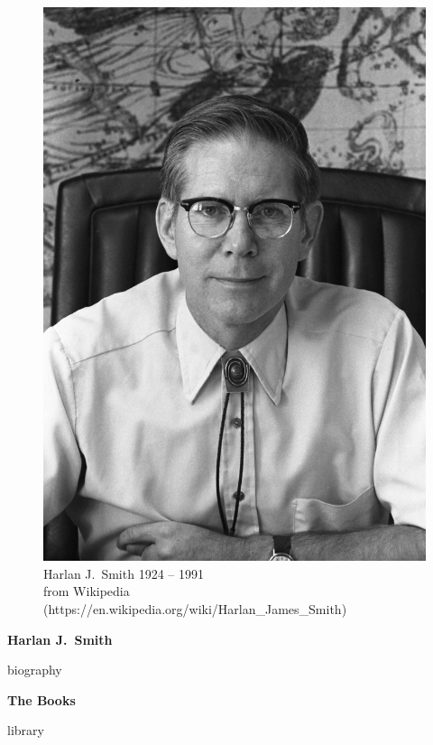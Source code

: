 \documentclass[letterpaper]{book}
\begin{document}
\thispagestyle{empty}
\begin{figure}[t]
  \centering
  \includegraphics{hjs_photo.jpg}
  Harlan J.~Smith 1924 -- 1991 \\
  {\scriptsize from Wikipedia
  (https://en.wikipedia.org/wiki/Harlan\_James\_Smith)}
  \label{fig:hjs}
\end{figure}
\clearpage

\pagestyle{plain}
\vspace*{1 in}
\centerline{\Large \bf Harlan J.\ Smith}
\bigskip\bigskip
{biography}
\newpage

\vspace*{1 in}
\centerline{\Large \bf The Books}
\bigskip\bigskip
{library}
\newpage

\printbibliography
\end{document}
